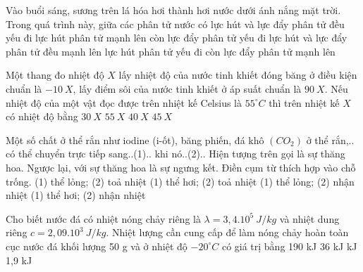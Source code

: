 \begin{ex}
	Vào buổi sáng, sương trên lá hóa hơi thành hơi nước dưới ánh nắng mặt trời. Trong quá trình này, giữa các phân tử nước có
	\choice
	{\True lực hút và lực đẩy phân tử đều yếu đi}
	{lực hút phân tử mạnh lên còn lực đẩy phân tử yếu đi}
	{lực hút và lực đẩy phân tử đều mạnh lên}
	{lực hút phân tử yếu đi còn lực đẩy phân tử mạnh lên}
	\loigiai{}
\end{ex}
\begin{ex}
	Một thang đo nhiệt độ $X$ lấy nhiệt độ của nước tinh khiết đóng băng ở điều kiện chuẩn là $-10\ X$, lấy điểm sôi của nước tinh khiết ở áp suất chuẩn là $90\ X$. Nếu nhiệt độ của một vật đọc được trên nhiệt kế Celsius là $55^\circ C$ thì trên nhiệt kế $X$ có nhiệt độ bằng
	\choice
	{$30\ X$}
	{$55\ X$}
	{$40\ X$}
	{\True $45\ X$}
	\loigiai{}
\end{ex}
\begin{ex}
	Một số chất ở thể rắn như iodine (i-ốt), băng phiến, đá khô $(CO_2)$ ở thể rắn,.. có thể chuyển trực tiếp sang..(1).. khi nó..(2).. Hiện tượng trên gọi là sự thăng hoa. Ngược lại, với sự thăng hoa là sự ngưng kết. Điền cụm từ thích hợp vào chỗ trống.
	\choice
	{(1) thể lỏng; (2) toả nhiệt}
	{(1) thể hơi; (2) toả nhiệt}
	{(1) thể lỏng; (2) nhận nhiệt}
	{\True (1) thể hơi; (2) nhận nhiệt}
	\loigiai{}
\end{ex}
\begin{ex}
	Cho biết nước đá có nhiệt nóng chảy riêng là $\lambda = 3,4 . 10^5\  J/kg$ và nhiệt dung riêng $c = 2,09 . 10^3\  J/kg$. Nhiệt lượng cần cung cấp để làm nóng chảy hoàn toàn cục nước đá khối lượng 50 g và ở nhiệt độ $-20^{\circ} C$ có giá trị bằng
	\choice
	{190 kJ}
	{36 kJ}
	{ kJ}
	{1,9 kJ}
	\loigiai{}
\end{ex}
